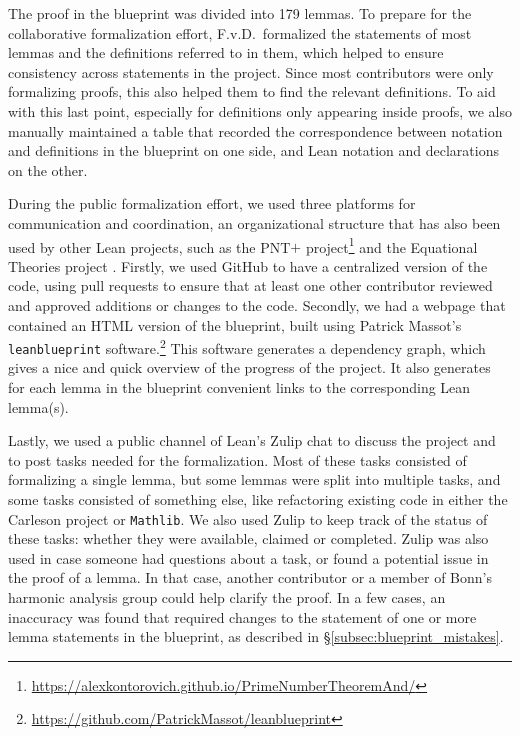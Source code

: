\documentclass[12pt]{amsart}
\newcommand{\mathlib}{\texttt{Mathlib}\xspace}
\theoremstyle{definition}
\theoremstyle{plain}
\begin{document}
The proof in the blueprint was divided into 179 lemmas.
To prepare for the collaborative formalization effort,
F.v.D.\ formalized the statements of most lemmas and the definitions referred to in them, which helped to ensure consistency across statements in the project. Since most contributors were only formalizing proofs, this also helped them to find the relevant definitions. To aid with this last point, especially for definitions only appearing inside proofs, we also manually maintained a table
that recorded the correspondence between notation and definitions in the blueprint on one side,
and Lean notation and declarations on the other.

During the public formalization effort, we used three platforms for communication and coordination,
an organizational structure that has also been used by other Lean projects,
such as the PNT$+$ project\footnote{\url{https://alexkontorovich.github.io/PrimeNumberTheoremAnd/}}
and the Equational Theories project \cite{tao2025equationaltheories}.
Firstly, we used GitHub to have a centralized version of the code,
using pull requests to ensure that at least one other contributor reviewed and approved additions or changes to the code.
Secondly, we had a webpage that contained an HTML version of the blueprint,
built using Patrick Massot's \texttt{leanblueprint} software.\footnote{\url{https://github.com/PatrickMassot/leanblueprint}}
This software generates a dependency graph, which gives a nice and quick overview of the progress of the project.
It also generates for each lemma in the blueprint convenient links to the corresponding Lean lemma(s).

Lastly, we used a public channel of Lean's Zulip chat to discuss the project and to post tasks needed for the formalization.
Most of these tasks consisted of formalizing a single lemma,
but some lemmas were split into multiple tasks, and some tasks consisted of something else,
like refactoring existing code in either the Carleson project or \mathlib.
We also used Zulip to keep track of the status of these tasks:
whether they were available, claimed or completed.
Zulip was also used in case someone had questions about a task,
or found a potential issue in the proof of a lemma.
In that case, another contributor or a member of Bonn's harmonic analysis group could help clarify the proof.
In a few cases, an inaccuracy was found that required changes to the statement of one or more lemma statements in the blueprint,
as described in \S\ref{subsec:blueprint_mistakes}.
\end{document}
